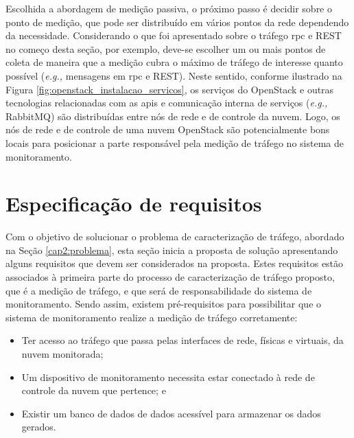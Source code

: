 Escolhida a abordagem de medição passiva, o próximo passo é decidir sobre o ponto de medição, que pode ser distribuído em vários pontos da rede dependendo da necessidade.
%
Considerando o que foi apresentado sobre o tráfego \ac{rpc} e REST no começo desta seção, por exemplo, deve-se escolher um ou mais pontos de coleta de maneira que a medição cubra o máximo de tráfego de interesse quanto possível (\textit{e.g.,} mensagens em \ac{rpc} e REST).
%
Neste sentido, conforme ilustrado na Figura \ref{fig:openstack_instalacao_servicos}, os serviços do OpenStack e outras tecnologias relacionadas com as \acp{api} e comunicação interna de serviços (\textit{e.g.,} RabbitMQ) são distribuídas entre nós de rede e de controle da nuvem.
%
Logo, os nós de rede e de controle de uma nuvem OpenStack são potencialmente bons locais para posicionar a parte responsável pela medição de tráfego no sistema de monitoramento.
%


\section{Especificação de requisitos}
\label{cap3:requisitos}

Com o objetivo de solucionar o problema de caracterização de tráfego, abordado na Seção \ref{cap2:problema}, esta seção inicia a proposta de solução apresentando alguns requisitos que devem ser considerados na proposta.
%
Estes requisitos estão associados à primeira parte do processo de caracterização de tráfego proposto, que é a medição de tráfego, e que será de responsabilidade do sistema de monitoramento.
%
Sendo assim, existem pré-requisitos para possibilitar que o sistema de monitoramento realize a medição de tráfego corretamente:

\begin{itemize}
	\item Ter acesso ao tráfego que passa pelas interfaces de rede, físicas e virtuais, da nuvem monitorada;
    \item Um dispositivo de monitoramento necessita estar conectado à rede de controle da nuvem que pertence; e
    \item Existir um banco de dados de dados acessível para armazenar os dados gerados.
\end{itemize}

